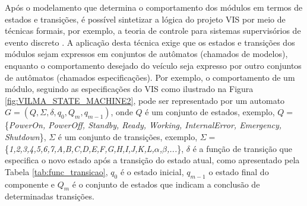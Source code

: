 \documentclass[conference]{IEEEtran}
\begin{document}
Após o modelamento que determina o comportamento dos módulos em termos de estados e transições, é possível sintetizar a lógica do projeto VIS por meio de técnicas formais, por exemplo, a teoria de controle para sistemas supervisórios de evento discreto \cite{event_systems}. 
A aplicação desta técnica exige que os estados e transições dos módulos sejam expressos em conjuntos de autômatos (chamados de modelos), enquanto o comportamento desejado do veículo seja expresso por outro conjuntos de autômatos (chamados especificações). 
Por exemplo, o comportamento de um módulo, seguindo as especificações do VIS como ilustrado na Figura \ref{fig:VILMA_STATE_MACHINE2}, pode ser representado por um automato $G = (Q,\Sigma,\delta,q_{0},Q_{m},q_{m-1})$, onde $Q$ é um conjunto de estados, exemplo, $Q =$ \{\textit{PowerOn, PowerOff, Standby, Ready, Working, InternalError, Emergency, Shutdown}\}, $\Sigma$ é um conjunto de transições, exemplo, $\Sigma =$ \{\textit{1,2,3,4,5,6,7,A,B,C,D,E,F,G,H,I,J,K,L,$\alpha$,$\beta$,...}\}, $\delta$ é a função de transição que especifica o novo estado após a transição do estado atual, como apresentado pela Tabela \ref{tab:func_transicao}, $q_{0}$ é o estado inicial, $q_{m-1}$ o estado final do componente e $Q_{m}$ é o conjunto de estados que indicam a conclusão de determinadas transições.
\end{document}
